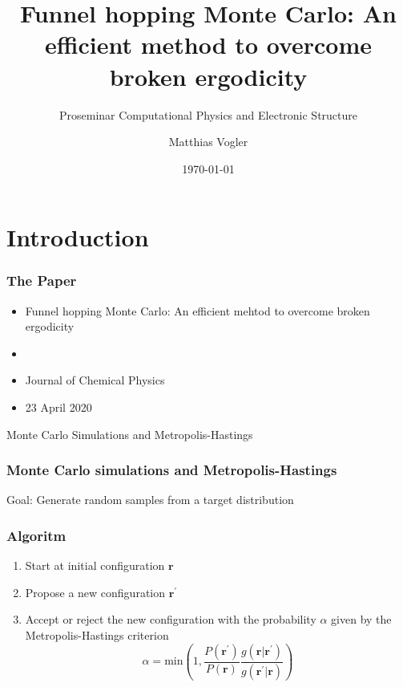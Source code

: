 \documentclass{beamer}
\title{Funnel hopping Monte Carlo: An efficient method to overcome broken ergodicity}
\subtitle{Proseminar Computational Physics and Electronic Structure}
\date{\today}
\author{Matthias Vogler}
\institute{Departement of Physics\\ University of Basel}
\begin{document}
  \maketitle
  \section{Introduction}
  \begin{frame}
  \frametitle{The Paper}
   	\begin{itemize}
   		\item Funnel hopping Monte Carlo: An efficient mehtod to overcome broken ergodicity \cite{Finkler2020}
   		\item \citeauthor{Finkler2020} 
   		\item Journal of Chemical Physics
   		\item 23 April 2020

   	\end{itemize}
  \end{frame}

  \begin{frame}
  	\begin{center}
  		\huge
  		Monte Carlo Simulations and Metropolis-Hastings
  	\end{center}

  \end{frame}

  \begin{frame}
  	\frametitle{Monte Carlo simulations and Metropolis-Hastings}
  	\large Goal: Generate random samples from a target distribution \\
  	\subsubsection{Algoritm}
  	\begin{enumerate}
  		\item Start at initial configuration $\mathbf{r}$
  		\item Propose a new configuration $\mathbf{r}^\prime$
  		\item Accept or reject the new configuration with the probability $\alpha$ given by the Metropolis-Hastings criterion \cite{Hastings1970}
  		\begin{equation}
  		\alpha = \text{min}\left(1,\frac{P(\mathbf{r}^\prime)}{P(\mathbf{r})}\frac{g(\mathbf{r}|\mathbf{r}^\prime)}{g(\mathbf{r}^\prime|\mathbf{r})}\right)
  		\end{equation}
  	\end{enumerate}
  \end{frame}
\end{document}
